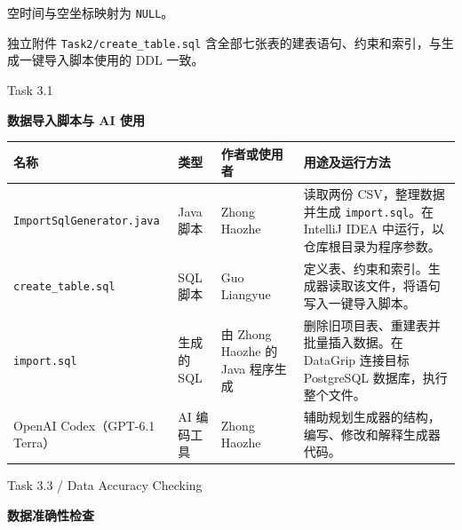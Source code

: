 \documentclass[10pt,a4paper]{article}
\newcommand{\heading}[2]{%
  {\small #1}\par\vspace{2pt}%
  {\LARGE\bfseries #2}\par\vspace{7pt}}
\begin{document}
空时间与空坐标映射为 \texttt{NULL}。

独立附件 \texttt{Task2/create\_table.sql} 含全部七张表的建表语句、约束和索引，与生成一键导入脚本使用的 DDL 一致。

\clearpage
\heading{Task 3.1}{数据导入脚本与 AI 使用}
\begin{tabularx}{\linewidth}{@{}>{\raggedright\arraybackslash}p{46mm}p{18mm}p{28mm}L@{}}
\toprule
\textbf{名称} & \textbf{类型} & \textbf{作者或使用者} & \textbf{用途及运行方法}\\
\midrule
\texttt{ImportSqlGenerator.}\allowbreak\texttt{java} & Java 脚本 & Zhong Haozhe & 读取两份 CSV，整理数据并生成 \texttt{import.sql}。在 IntelliJ IDEA 中运行，以仓库根目录为程序参数。\\
\addlinespace
\texttt{create\_table.sql} & SQL 脚本 & Guo Liangyue & 定义表、约束和索引。生成器读取该文件，将语句写入一键导入脚本。\\
\addlinespace
\texttt{import.sql} & 生成的 SQL & 由 Zhong Haozhe 的 Java 程序生成 & 删除旧项目表、重建表并批量插入数据。在 DataGrip 连接目标 PostgreSQL 数据库，执行整个文件。\\
\addlinespace
OpenAI Codex（GPT-6.1 Terra） & AI 编码工具 & Zhong Haozhe & 辅助规划生成器的结构，编写、修改和解释生成器代码。\\
\bottomrule
\end{tabularx}

\clearpage
\heading{Task 3.3 / Data Accuracy Checking}{数据准确性检查}
\end{document}
